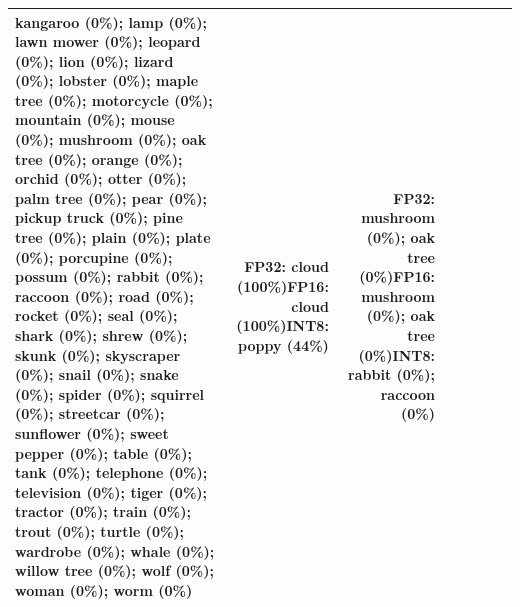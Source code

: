 \begin{longtable}{p{2.8cm} r r r r p{5.0cm} p{4.2cm} p{4.2cm}}
kangaroo (0\%); lamp (0\%); lawn mower (0\%); leopard (0\%); lion (0\%); lizard (0\%); lobster (0\%); maple tree (0\%); motorcycle (0\%); mountain (0\%); mouse (0\%); mushroom (0\%); oak tree (0\%); orange (0\%); orchid (0\%); otter (0\%); palm tree (0\%); pear (0\%); pickup truck (0\%); pine tree (0\%); plain (0\%); plate (0\%); porcupine (0\%); possum (0\%); rabbit (0\%); raccoon (0\%); road (0\%); rocket (0\%); seal (0\%); shark (0\%); shrew (0\%); skunk (0\%); skyscraper (0\%); snail (0\%); snake (0\%); spider (0\%); squirrel (0\%); streetcar (0\%); sunflower (0\%); sweet pepper (0\%); table (0\%); tank (0\%); telephone (0\%); television (0\%); tiger (0\%); tractor (0\%); train (0\%); trout (0\%); turtle (0\%); wardrobe (0\%); whale (0\%); willow tree (0\%); wolf (0\%); woman (0\%); worm (0\%) & FP32: cloud (100\%)\newline FP16: cloud (100\%)\newline INT8: poppy (44\%) & FP32: mushroom (0\%); oak tree (0\%)\newline FP16: mushroom (0\%); oak tree (0\%)\newline INT8: rabbit (0\%); raccoon (0\%) \\ \hline

\end{longtable}
